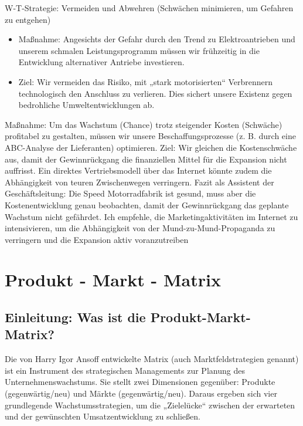 \documentclass[12pt, a4paper]{article}
\begin{document}
W-T-Strategie: Vermeiden und Abwehren (Schwächen minimieren, um Gefahren zu entgehen)
\begin{itemize}
    \item Maßnahme: Angesichts der Gefahr durch den Trend zu Elektroantrieben und unserem schmalen Leistungsprogramm müssen wir frühzeitig in die Entwicklung alternativer Antriebe investieren.
    \item Ziel: Wir vermeiden das Risiko, mit „stark motorisierten“ Verbrennern technologisch den Anschluss zu verlieren. Dies sichert unsere Existenz gegen bedrohliche Umweltentwicklungen ab.
\end{itemize}
Maßnahme: Um das Wachstum (Chance) trotz steigender Kosten (Schwäche) profitabel zu gestalten, müssen wir unsere Beschaffungsprozesse (z. B. durch eine ABC-Analyse der Lieferanten) optimieren.
Ziel: Wir gleichen die Kostenschwäche aus, damit der Gewinnrückgang die finanziellen Mittel für die Expansion nicht auffrisst. Ein direktes Vertriebsmodell über das Internet könnte zudem die Abhängigkeit von teuren Zwischenwegen verringern.
Fazit als Assistent der Geschäftsleitung: Die Speed Motorradfabrik ist gesund, muss aber die Kostenentwicklung 
genau beobachten, damit der Gewinnrückgang das geplante Wachstum nicht gefährdet. Ich empfehle, die Marketingaktivitäten 
im Internet zu intensivieren, um die Abhängigkeit von der Mund-zu-Mund-Propaganda zu verringern und die Expansion aktiv voranzutreiben
\newpage

\section{Produkt - Markt - Matrix}
\subsection{Einleitung: Was ist die Produkt-Markt-Matrix?}
Die von Harry Igor Ansoff entwickelte Matrix (auch Marktfeldstrategien genannt) ist ein Instrument 
des strategischen Managements zur Planung des Unternehmenswachstums. Sie stellt zwei Dimensionen 
gegenüber: Produkte (gegenwärtig/neu) und Märkte (gegenwärtig/neu). Daraus ergeben sich vier 
grundlegende Wachstumsstrategien, um die „Zielelücke“ zwischen der erwarteten und der gewünschten Umsatzentwicklung zu schließen.
\end{document}

